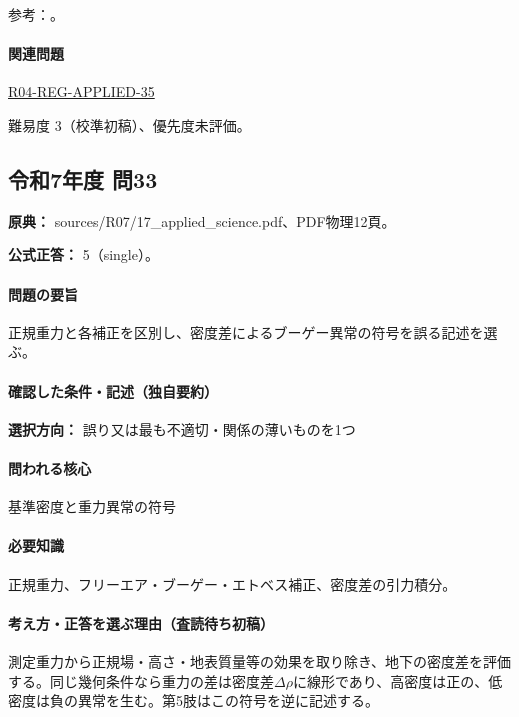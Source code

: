 \par 参考：\cite{gsi_gravity_definitions,kanaya_okuma2011,sato_lei2009_ae}。

\paragraph{関連問題} \hyperref[q:r04-reg-applied-35]{R04-REG-APPLIED-35}

\par 難易度 3（校準初稿）、優先度未評価。

\subsection{令和7年度 問33}
\label{q:r07-reg-applied-33}

\noindent\textbf{原典：} sources/R07/17\_applied\_science.pdf、PDF物理12頁。

\textbf{公式正答：} 5（single）。

\paragraph{問題の要旨} 正規重力と各補正を区別し、密度差によるブーゲー異常の符号を誤る記述を選ぶ。

\paragraph{確認した条件・記述（独自要約）}\mbox{}\par

\noindent\textbf{選択方向：} 誤り又は最も不適切・関係の薄いものを1つ\par

\paragraph{問われる核心} 基準密度と重力異常の符号

\paragraph{必要知識} 正規重力、フリーエア・ブーゲー・エトベス補正、密度差の引力積分。

\paragraph{考え方・正答を選ぶ理由（査読待ち初稿）} 測定重力から正規場・高さ・地表質量等の効果を取り除き、地下の密度差を評価する。同じ幾何条件なら重力の差は密度差\(\Delta\rho\)に線形であり、高密度は正の、低密度は負の異常を生む。第5肢はこの符号を逆に記述する。


